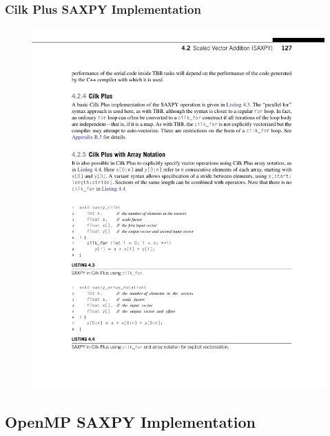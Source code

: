 \documentclass[xcolor=dvipsnames]{beamer}
\begin{document}
		\begin{frame} \frametitle{Cilk Plus SAXPY Implementation}
			\begin{figure}
				\centering
				\includegraphics[width=115mm]{images/listing-4-3.pdf}
			\end{figure}
		\end{frame}
		
	\subsection{OpenMP SAXPY Implementation}
	
\end{document}

